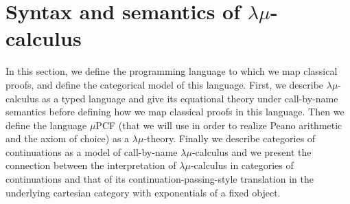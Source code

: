 \documentclass{CSML}
\begin{document}
\section{Syntax and semantics of \texorpdfstring{$\lambda\mu$}{lambda-mu}-calculus}
\label{typedLanguages}
In this section, we define the programming language to which we map classical proofs, and define the categorical model of this language. First, we describe $\lambda\mu$-calculus as a typed language and give its equational theory under call-by-name semantics before defining how we map classical proofs in this language. Then we define the language $\mu$PCF (that we will use in order to realize Peano arithmetic and the axiom of choice) as a $\lambda\mu$-theory. Finally we describe categories of continuations as a model of call-by-name $\lambda\mu$-calculus and we present the connection between the interpretation of $\lambda\mu$-calculus in categories of continuations and that of its continuation-passing-style translation in the underlying cartesian category with exponentials of a fixed object.
\end{document}
